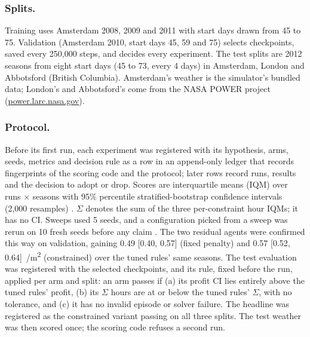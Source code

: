 \documentclass[letterpaper]{article} %
\newcommand{\eurm}{\texteuro/m\textsuperscript{2}}
\begin{document}
\subsubsection{Splits.}
Training uses Amsterdam 2008, 2009 and 2011 with start days drawn from 45 to 75. Validation (Amsterdam 2010, start days 45, 59 and 75) selects checkpoints, saved every 250,000 steps, and decides every experiment. The test splits are 2012 seasons from eight start days (45 to 73, every 4 days) in Amsterdam, London and Abbotsford (British Columbia). Amsterdam's weather is the simulator's bundled data; London's and Abbotsford's come from the NASA POWER project (\url{power.larc.nasa.gov}).

\subsubsection{Protocol.}
Before its first run, each experiment was registered with its hypothesis, arms, seeds, metrics and decision rule as a row in an append-only ledger that records fingerprints of the scoring code and the protocol; later rows record runs, results and the decision to adopt or drop. Scores are interquartile means (IQM) over runs $\times$ seasons with 95\% percentile stratified-bootstrap confidence intervals (2,000 resamples) \cite{agarwal2021precipice}. $\Sigma$ denotes the sum of the three per-constraint hour IQMs; it has no CI. Sweeps used 5 seeds, and a configuration picked from a sweep was rerun on 10 fresh seeds before any claim \cite{patterson2024empirical}.
The two residual agents were confirmed this way on validation, gaining 0.49 [0.40, 0.57] (fixed penalty) and 0.57 [0.52, 0.64]~\eurm{} (constrained) over the tuned rules' same seasons.
The test evaluation was registered with the selected checkpoints, and its rule, fixed before the run, applied per arm and split: an arm passes if (a) its profit CI lies entirely above the tuned rules' profit, (b) its $\Sigma$ hours are at or below the tuned rules' $\Sigma$, with no tolerance, and (c) it has no invalid episode or solver failure. The headline was registered as the constrained variant passing on all three splits. The test weather was then scored once; the scoring code refuses a second run.
\end{document}

